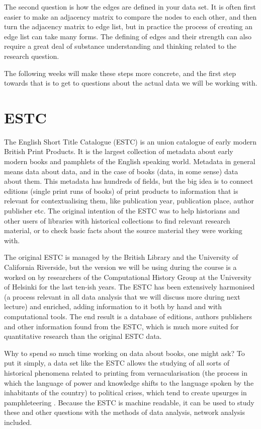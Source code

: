 \documentclass[
]{book}
\begin{document}
The second question is how the edges are defined in your data set. It is often first easier to make an adjacency matrix to compare the nodes to each other, and then turn the adjacency matrix to edge list, but in practice the process of creating an edge list can take many forms. The defining of edges and their strength can also require a great deal of substance understanding and thinking related to the research question.

The following weeks will make these steps more concrete, and the first step towards that is to get to questions about the actual data we will be working with.

\hypertarget{estc}{%
\section{ESTC}\label{estc}}

The English Short Title Catalogue (ESTC) is an union catalogue of early modern British Print Products. It is the largest collection of metadata about early modern books and pamphlets of the English speaking world. Metadata in general means data about data, and in the case of books (data, in some sense) data about them. This metadata has hundreds of fields, but the big idea is to connect editions (single print runs of books) of print products to information that is relevant for contextualising them, like publication year, publication place, author publisher etc. The original intention of the ESTC was to help historians and other users of libraries with historical collections to find relevant research material, or to check basic facts about the source material they were working with.

The original ESTC is managed by the British Library and the University of California Riverside, but the version we will be using during the course is a worked on by researchers of the Computational History Group at the University of Helsinki for the last ten-ish years. The ESTC has been extensively harmonised (a process relevant in all data analysis that we will discuss more during next lecture) and enriched, adding information to it both by hand and with computational tools. The end result is a database of editions, authors publishers and other information found from the ESTC, which is much more suited for quantitative research than the original ESTC data.

Why to spend so much time working on data about books, one might ask? To put it simply, a data set like the ESTC allows the studying of all sorts of historical phenomena related to printing from vernacularisation (the process in which the language of power and knowledge shifts to the language spoken by the inhabitants of the country) to political crises, which tend to create upsurges in pamphleteering \citep{Lahti2019}. Because the ESTC is machine readable, it can be used to study these and other questions with the methods of data analysis, network analysis included.
\end{document}
